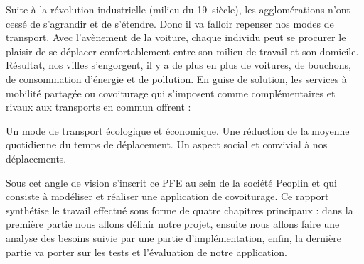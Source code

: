 
\begin{general}

\hspace{1cm}Suite à la révolution industrielle (milieu du 19\ieme\ siècle), les agglomérations n’ont cessé de s’agrandir et de s’étendre. Donc il va falloir repenser nos modes de transport.\newline
Avec l’avènement de la voiture, chaque individu peut se procurer le plaisir de se déplacer confortablement entre son milieu de travail et son domicile.\newline
Résultat, nos villes s’engorgent, il y a de plus en plus de voitures, de bouchons, de consommation d’énergie et de pollution.\newline
En guise de solution, les services à mobilité partagée ou covoiturage qui s’imposent comme complémentaires et rivaux aux transports en commun offrent :
\begin{itemize}
\itemb Un mode de transport écologique et économique.
\itemb Une réduction de la moyenne quotidienne du temps de déplacement.
\itemb Un aspect social et convivial à nos déplacements.
\end{itemize}
Sous cet angle de vision s’inscrit ce PFE au sein de la société Peoplin et qui consiste à modéliser et réaliser une application de covoiturage.\newline
Ce rapport synthétise le travail effectué sous forme de quatre chapitres principaux : dans la première partie nous allons définir notre projet, ensuite nous allons faire une analyse des besoins suivie par une partie d'implémentation, enfin, la dernière partie va porter sur les tests et l'évaluation de notre application.
\end{general}
